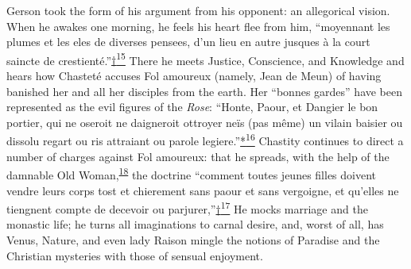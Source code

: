 Gerson took the form of his argument from his opponent: an allegorical
vision. When he awakes one morning, he feels his heart flee from him,
``moyennant les plumes et les eles de diverses pensees, d'un lieu en
autre jusques à la court saincte de
crestienté.''\protect\hypertarget{11_Chapter_Four__THE_FORMS_OF_LOVE.xhtmlux5cux23id_3129}{\protect\hyperlink{23_NOTES.xhtmlux5cux23id_3130}{†\textsuperscript{15}}}
There he meets Justice, Conscience, and Knowledge and hears how
\protect\hypertarget{11_Chapter_Four__THE_FORMS_OF_LOVE.xhtmlux5cux23page_139}{}{}Chasteté
accuses Fol amoureux (namely, Jean de Meun) of having banished her and
all her disciples from the earth. Her ``bonnes gardes'' have been
represented as the evil figures of the \emph{Rose}: ``Honte, Paour, et
Dangier le bon portier, qui ne oseroit ne daigneroit ottroyer neïs (pas
même) un vilain baisier ou dissolu regart ou ris attraiant ou parole
legiere.''\protect\hypertarget{11_Chapter_Four__THE_FORMS_OF_LOVE.xhtmlux5cux23id_3131}{\protect\hyperlink{23_NOTES.xhtmlux5cux23id_3132}{*\textsuperscript{16}}}
Chastity continues to direct a number of charges against Fol amoureux:
that he spreads, with the help of the damnable Old
Woman,\textsuperscript{\protect\hypertarget{11_Chapter_Four__THE_FORMS_OF_LOVE.xhtmlux5cux23id_1452}{\protect\hyperlink{23_NOTES.xhtmlux5cux23id_1453}{18}}}
the doctrine ``comment toutes jeunes filles doivent vendre leurs corps
tost et chierement sans paour et sans vergoigne, et qu'elles ne
tiengnent compte de decevoir ou
parjurer,''\protect\hypertarget{11_Chapter_Four__THE_FORMS_OF_LOVE.xhtmlux5cux23id_3133}{\protect\hyperlink{23_NOTES.xhtmlux5cux23id_3134}{†\textsuperscript{17}}}
He mocks marriage and the monastic life; he turns all imaginations to
carnal desire, and, worst of all, has Venus, Nature, and even lady
Raison mingle the notions of Paradise and the Christian mysteries with
those of sensual enjoyment.


